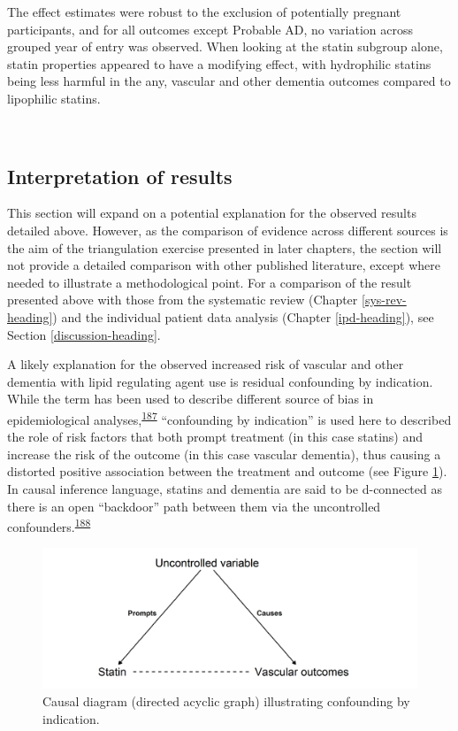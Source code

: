 \documentclass[a4paper, twoside]{templates/ociamthesis}
\begin{document}
The effect estimates were robust to the exclusion of potentially pregnant participants, and for all outcomes except Probable AD, no variation across grouped year of entry was observed. When looking at the statin subgroup alone, statin properties appeared to have a modifying effect, with hydrophilic statins being less harmful in the any, vascular and other dementia outcomes compared to lipophilic statins.

~

\hypertarget{interpretation-of-results}{%
\subsection{Interpretation of results}\label{interpretation-of-results}}

This section will expand on a potential explanation for the observed results detailed above. However, as the comparison of evidence across different sources is the aim of the triangulation exercise presented in later chapters, the section will not provide a detailed comparison with other published literature, except where needed to illustrate a methodological point. For a comparison of the result presented above with those from the systematic review (Chapter \ref{sys-rev-heading}) and the individual patient data analysis (Chapter \ref{ipd-heading}), see Section \ref{discussion-heading}.

A likely explanation for the observed increased risk of vascular and other dementia with lipid regulating agent use is residual confounding by indication. While the term has been used to describe different source of bias in epidemiological analyses,\textsuperscript{\protect\hyperlink{ref-salas1999}{187}} ``confounding by indication'' is used here to described the role of risk factors that both prompt treatment (in this case statins) and increase the risk of the outcome (in this case vascular dementia), thus causing a distorted positive association between the treatment and outcome (see Figure \ref{fig:indicationBias}). In causal inference language, statins and dementia are said to be d-connected as there is an open ``backdoor'' path between them via the uncontrolled confounders.\textsuperscript{\protect\hyperlink{ref-suttorp2015}{188}}





\begin{figure}[H]
\includegraphics[width=1\linewidth]{figures/cprd-analysis/indicationBias} \caption[Confounding by indication causal diagram]{Causal diagram (directed acyclic graph) illustrating confounding by indication.}\label{fig:indicationBias}
\end{figure}
\end{document}
